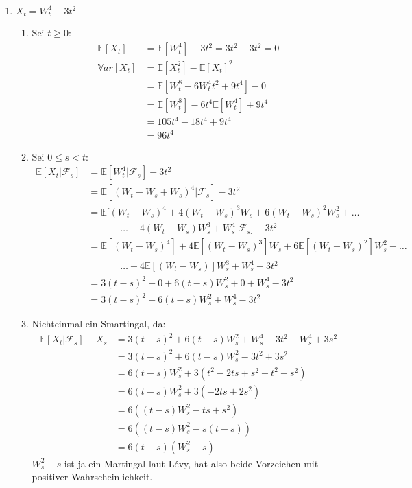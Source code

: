 \documentclass[a4paper,11pt,notitlepage,fullpage]{article}
\newcommand{\E}{\mathbb{E}}
\newcommand{\F}{\mathcal{F}}
\newcommand{\V}{\mathbb Var}
\begin{document}
\begin{enumerate}
\newpage
\item $X_t = W_t^4 - 3t^2$
\begin{enumerate}
\item Sei $t \geq 0$:
\begin{align*}
\E[X_t] &= \E[W_t^4] - 3t^2 = 3t^2 - 3t^2 = 0 \\
\V[X_t] &= \E[X_t^2] - \E[X_t]^2 \\
&= \E[W_t^8 - 6W_t^4 t^2 + 9t^4] - 0 \\
&= \E[W_t^8] - 6t^4\E[W_t^4] + 9t^4 \\
&= 105 t^4 - 18 t^4 + 9t^4 \\
&= 96 t^4
\end{align*}
\item Sei $0 \leq s < t$:
\begin{align*}
\E[X_t | \F_s] &= \E[W_t^4 | \F_s] - 3t^2 \\
&= \E[(W_t - W_s + W_s)^4 | \F_s] - 3t^2 \\
&= \E[(W_t - W_s)^4 + 4(W_t - W_s)^3W_s + 6(W_t - W_s)^2W_s^2 + \hdots \\
&\hspace{40pt} \hdots + 4(W_t - W_s)W_s^3 + W_s^4 | \F_s] - 3t^2 \\
&= \E[(W_t - W_s)^4] + 4\E[(W_t - W_s)^3]W_s + 6\E[(W_t - W_s)^2]W_s^2 + \hdots \\
&\hspace{40pt} \hdots + 4\E[(W_t - W_s)]W_s^3 + W_s^4 - 3t^2 \\
&= 3(t-s)^2 + 0 + 6(t-s)W_s^2 + 0 + W_s^4 - 3t^2 \\
&= 3(t-s)^2 + 6(t-s)W_s^2 + W_s^4 - 3t^2
\end{align*}
\item Nichteinmal ein Smartingal, da:
\begin{align*}
\E[X_t | \F_s] - X_s &= 3(t-s)^2 + 6(t-s)W_s^2 + W_s^4 - 3t^2 - W_s^4 + 3s^2 \\
&= 3(t-s)^2 + 6(t-s)W_s^2 - 3t^2 + 3s^2 \\
&= 6(t-s)W_s^2 + 3(t^2 - 2ts + s^2 - t^2 + s^2) \\
&= 6(t-s)W_s^2 + 3(-2ts +2 s^2) \\
&= 6( (t-s)W_s^2 - ts + s^2) \\
&= 6( (t-s)W_s^2 - s(t - s)) \\
&= 6(t-s)(W_s^2 - s)
\end{align*}
$W_s^2 - s$ ist ja ein Martingal laut Lévy, hat also beide Vorzeichen mit positiver Wahrscheinlichkeit.

\end{enumerate}


\end{enumerate}
\end{document}
